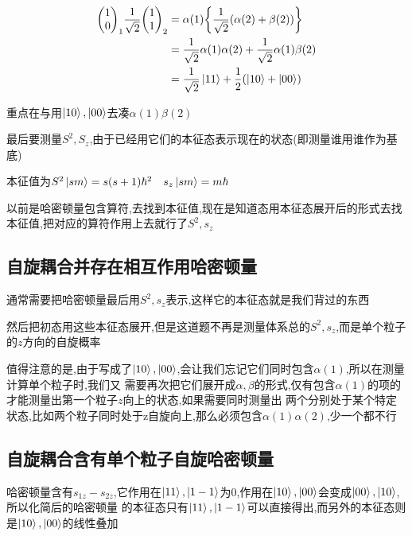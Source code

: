 \documentclass{article}
\begin{document}
            \begin{align*}
                \mqty(1 \\ 0)_{1} \frac{1}{\sqrt{2}}\mqty(1 \\ 1)_{2} &= \alpha(1) \qty{ \frac{1}{\sqrt{2}} (\alpha(2) + \beta(2) ) } \\
                                                                      &= \frac{1}{\sqrt{2}} \alpha(1)\alpha(2) + \frac{1}{\sqrt{2}}\alpha(1)\beta(2)  \\
                                                                      &= \frac{1}{\sqrt{2}} \ket{11} + \frac{1}{2} (\ket{10} + \ket{00})
            \end{align*}
            
            重点在与用$\ket{10},\ket{00}$去凑$\alpha(1)\beta(2)$
            
            最后要测量$S^{2},S_{z}$,由于已经用它们的本征态表示现在的状态(即测量谁用谁作为基底)

            本征值为$S^{2} \ket{sm} = s(s+1)\hbar^{2} \quad s_{z}\ket{sm} = m\hbar $ 

            以前是哈密顿量包含算符,去找到本征值,现在是知道态用本征态展开后的形式去找本征值,把对应的算符作用上去就行了$S^{2},s_{z}$

        \subsection{自旋耦合并存在相互作用哈密顿量}
            通常需要把哈密顿量最后用$S^{2},s_{z}$表示,这样它的本征态就是我们背过的东西

            然后把初态用这些本征态展开,但是这道题不再是测量体系总的$S^{2},s_{z}$,而是单个粒子的$z$方向的自旋概率

            值得注意的是,由于写成了$\ket{10},\ket{00}$,会让我们忘记它们同时包含$\alpha(1)$,所以在测量计算单个粒子时,我们又
            需要再次把它们展开成$\alpha , \beta$的形式,仅有包含$\alpha(1)$的项的才能测量出第一个粒子$z$向上的状态,如果需要同时测量出
            两个分别处于某个特定状态,比如两个粒子同时处于z自旋向上,那么必须包含$\alpha(1)\alpha(2)$,少一个都不行


        \subsection{自旋耦合含有单个粒子自旋哈密顿量}
            哈密顿量含有$s_{1z}-s_{2z}$,它作用在$\ket{11},\ket{1-1}$为0,作用在$\ket{10},\ket{00}$会变成$\ket{00},\ket{10}$,所以化简后的哈密顿量
            的本征态只有$\ket{11},\ket{1-1}$可以直接得出,而另外的本征态则是$\ket{10},\ket{00}$的线性叠加
\end{document}
